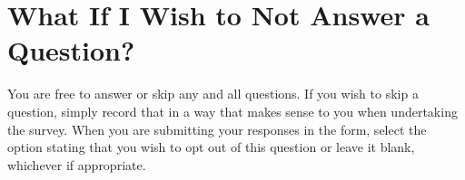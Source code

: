\section{What If I Wish to Not Answer a Question?}
You are free to answer or skip any and all questions. If you wish to skip a question, simply record that in a way that makes sense to you when undertaking the survey. When you are submitting your responses in the form, select the option stating that you wish to opt out of this question or leave it blank, whichever if appropriate.